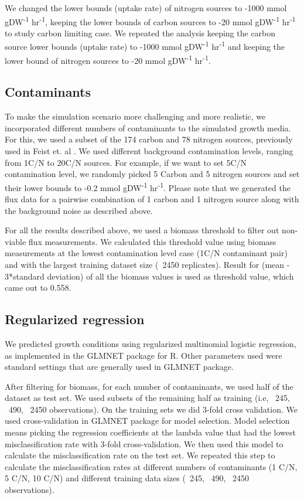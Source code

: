 \documentclass[12pt]{article}
\begin{document}
We changed the lower bounds (uptake rate) of nitrogen sources to -1000 mmol gDW\textsuperscript{-1} hr\textsuperscript{-1}, keeping the lower bounds of carbon sources to -20 mmol gDW\textsuperscript{-1} hr\textsuperscript{-1} to study carbon limiting case. We repeated the analysis keeping the carbon source lower bounds (uptake rate) to -1000 mmol gDW\textsuperscript{-1} hr\textsuperscript{-1} and keeping the lower bound of nitrogen sources to -20 mmol gDW\textsuperscript{-1} hr\textsuperscript{-1}. 

\subsection*{Contaminants}
To make the simulation scenario more challenging and more realistic, we incorporated different numbers of contaminants to the simulated growth media. For this, we used a subset of the 174 carbon and 78 nitrogen sources, previously used in Feist et. al \cite{Feistetal2007}.  We used different background contamination levels, ranging from 1C/N to 20C/N sources. For example, if we want to set 5C/N contamination level, we randomly picked 5 Carbon and 5 nitrogen sources and set their lower bounds to -0.2 mmol gDW\textsuperscript{-1} hr\textsuperscript{-1}. Please note that we generated the flux data for a pairwise combination of 1 carbon and 1 nitrogen source along with the background noise as described above. 

For all the results described above, we used a biomass threshold to filter out non-viable flux measurements. We calculated this threshold value using biomass measurements at the lowest contamination level case (1C/N contaminant pair) and with the largest training dataset size (~2450 replicates). Result for (mean - 3*standard deviation) of all the biomass values is used as threshold value, which came out to 0.558.

\subsection*{Regularized regression}

We predicted growth conditions using regularized multinomial logistic regression, as implemented in the GLMNET package \cite{Friedmanetal2010} for R. Other parameters used were standard settings that are generally used in GLMNET package.

After filtering for biomass, for each number of contaminants, we used half of the dataset as test set. We used subsets of the remaining half as training (i.e, ~245, ~490, ~2450 observations). On the training sets we did 3-fold cross validation. We used cross-validation in GLMNET package for model selection. Model selection means picking the regression coefficients at the lambda value that had the lowest misclassification rate with 3-fold cross-validation. We then used this model to calculate the misclassification rate on the test set. We repeated this step to calculate the misclassification rates at different numbers of contaminants (1 C/N, 5 C/N, 10 C/N) and different training data sizes (~245, ~490, ~2450 observations).
\end{document}
